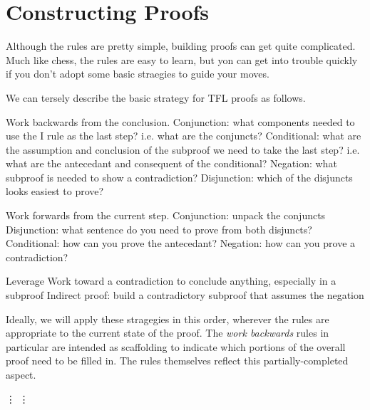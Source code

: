 \section{Constructing Proofs}

Although the rules are pretty simple, building proofs can get quite complicated.
Much like chess, the rules are easy to learn, but yon can get into trouble
quickly if you don't adopt some basic straegies to guide your moves.

We can tersely describe the basic strategy for TFL proofs as follows.

\begin{outline}[enumerate]

  \1 Work backwards from the conclusion.
  \2 Conjunction: what components needed to use the \eand I rule as the
  last step? i.e. what are the conjuncts?
  \2 Conditional: what are the assumption and conclusion of the subproof
  we need to take the last step? i.e. what are the antecedant and consequent
  of the conditional?
  \2 Negation: what subproof is needed to show a contradiction?
  \2 Disjunction: which of the disjuncts looks easiest to prove?

  \1 Work forwards from the current step.
  \2 Conjunction: unpack the conjuncts
  \2 Disjunction: what sentence do you need to prove from both disjuncts?
  \2 Conditional: how can you prove the antecedant?
  \2 Negation: how can you prove a contradiction?

  \1 Leverage \ebot
  \2 Work toward a contradiction to conclude anything, especially in a subproof
  \2 Indirect proof: build a contradictory subproof that assumes the negation

\end{outline}

Ideally, we will apply these stragegies in this order, wherever the rules are
appropriate to the current state of the proof. The \emph{work backwards} rules
in particular are intended as scaffolding to indicate which portions of the
overall proof need to be filled in. The rules themselves reflect this
partially-completed aspect.

\begin{fitchrule}
  \label{def:proving-conjunctions}
  \leavevmode
  \vspace{-0.9\baselineskip}
  \begin{fitchproof}
     {\vdots}    
     {\ephi}
     {\vdots}    
     {\epsi}   
     {\ephi\eand\epsi} 
  \end{fitchproof}
\end{fitchrule}

